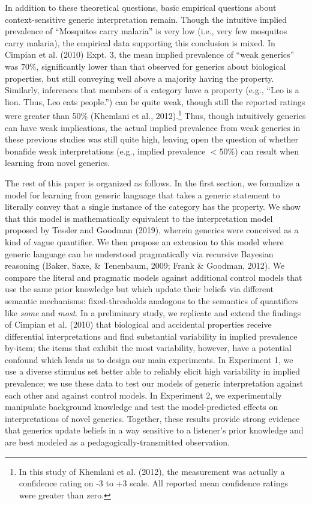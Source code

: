 \documentclass[floatsintext,doc]{apa6}
\let\rmarkdownfootnote\footnote%
\def\footnote{\protect\rmarkdownfootnote}
\begin{document}
In addition to these theoretical questions, basic empirical questions about context-sensitive generic interpretation remain.
Though the intuitive implied prevalence of \enquote{Mosquitos carry malaria} is very low (i.e., very few mosquitos carry malaria), the empirical data supporting this conclusion is mixed.
In Cimpian et al. (2010) Expt. 3, the mean implied prevalence of \enquote{weak generics} was \(70\%\), significantly lower than that observed for generics about biological properties, but still conveying well above a majority having the property.
Similarly, inferences that members of a category have a property (e.g., \enquote{Leo is a lion. Thus, Leo eats people.}) can be quite weak, though still the reported ratings were greater than 50\% (Khemlani et al., 2012).\footnote{In this study of Khemlani et al. (2012), the measurement was actually a confidence rating on -3 to +3 scale. All reported mean confidence ratings were greater than zero. }
Thus, though intuitively generics can have weak implications, the actual implied prevalence from weak generics in these previous studies was still quite high, leaving open the question of whether bonafide weak interpretations (e.g., implied prevalence \(<50\%\)) can result when learning from novel generics.

The rest of this paper is organized as follows.
In the first section, we formalize a model for learning from generic language that takes a generic statement to literally convey that a single instance of the category has the property.
We show that this model is mathematically equivalent to the interpretation model proposed by Tessler and Goodman (2019), wherein generics were conceived as a kind of vague quantifier.
We then propose an extension to this model where generic language can be understood pragmatically via recursive Bayesian reasoning (Baker, Saxe, \& Tenenbaum, 2009; Frank \& Goodman, 2012).
We compare the literal and pragmatic models against additional control models that use the same prior knowledge but which update their beliefs via different semantic mechanisms: fixed-thresholds analogous to the semantics of quantifiers like \emph{some} and \emph{most}.
In a preliminary study, we replicate and extend the findings of Cimpian et al. (2010) that biological and accidental properties receive differential interpretations and find substantial variability in implied prevalence by-item; the items that exhibit the most variability, however, have a potential confound which leads us to design our main experiments.
In Experiment 1, we use a diverse stimulus set better able to reliably elicit high variability in implied prevalence; we use these data to test our models of generic interpretation against each other and against control models.
In Experiment 2, we experimentally manipulate background knowledge and test the model-predicted effects on interpretations of novel generics.
Together, these results provide strong evidence that generics update beliefs in a way sensitive to a listener's prior knowledge and are best modeled as a pedagogically-transmitted observation.
\end{document}
